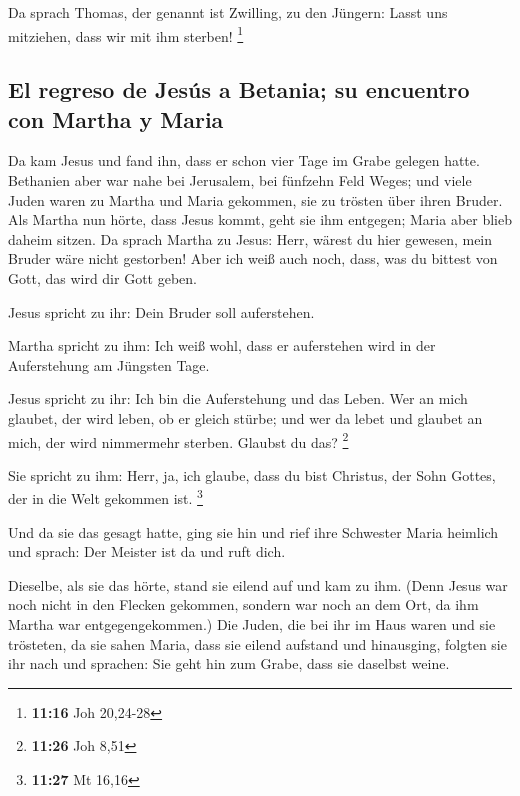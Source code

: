  Da sprach Thomas, der genannt ist Zwilling, zu den
Jüngern: Lasst uns mitziehen, dass wir mit ihm sterben! \footnote{\textbf{11:16}
  Joh 20,24-28}

\hypertarget{el-regreso-de-jesuxfas-a-betania-su-encuentro-con-martha-y-maria}{%
\subsection{El regreso de Jesús a Betania; su encuentro con Martha y
Maria}\label{el-regreso-de-jesuxfas-a-betania-su-encuentro-con-martha-y-maria}}

 Da kam Jesus und fand ihn, dass er schon vier Tage im
Grabe gelegen hatte.  Bethanien aber war nahe bei
Jerusalem, bei fünfzehn Feld Weges;  und viele Juden
waren zu Martha und Maria gekommen, sie zu trösten über ihren Bruder.
 Als Martha nun hörte, dass Jesus kommt, geht sie ihm
entgegen; Maria aber blieb daheim sitzen.  Da sprach
Martha zu Jesus: Herr, wärest du hier gewesen, mein Bruder wäre nicht
gestorben!  Aber ich weiß auch noch, dass, was du bittest
von Gott, das wird dir Gott geben.

 Jesus spricht zu ihr: Dein Bruder soll auferstehen.

 Martha spricht zu ihm: Ich weiß wohl, dass er
auferstehen wird in der Auferstehung am Jüngsten Tage.

 Jesus spricht zu ihr: Ich bin die Auferstehung und das
Leben. Wer an mich glaubet, der wird leben, ob er gleich stürbe;
 und wer da lebet und glaubet an mich, der wird
nimmermehr sterben. Glaubst du das? \footnote{\textbf{11:26} Joh 8,51}

 Sie spricht zu ihm: Herr, ja, ich glaube, dass du bist
Christus, der Sohn Gottes, der in die Welt gekommen ist. \footnote{\textbf{11:27}
  Mt 16,16}

 Und da sie das gesagt hatte, ging sie hin und rief ihre
Schwester Maria heimlich und sprach: Der Meister ist da und ruft dich.

 Dieselbe, als sie das hörte, stand sie eilend auf und
kam zu ihm.  (Denn Jesus war noch nicht in den Flecken
gekommen, sondern war noch an dem Ort, da ihm Martha war
entgegengekommen.)  Die Juden, die bei ihr im Haus waren
und sie trösteten, da sie sahen Maria, dass sie eilend aufstand und
hinausging, folgten sie ihr nach und sprachen: Sie geht hin zum Grabe,
dass sie daselbst weine.

